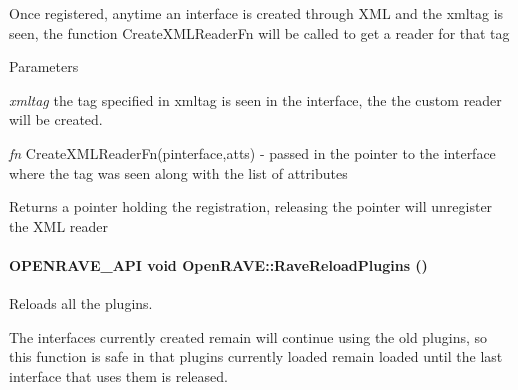 Once registered, anytime an interface is created through XML and the xmltag is seen, the function CreateXMLReaderFn will be called to get a reader for that tag 
\begin{DoxyParams}{Parameters}
\item[{\em xmltag}]the tag specified in xmltag is seen in the interface, the the custom reader will be created. \item[{\em fn}]CreateXMLReaderFn(pinterface,atts) -\/ passed in the pointer to the interface where the tag was seen along with the list of attributes \end{DoxyParams}
\begin{DoxyReturn}{Returns}
a pointer holding the registration, releasing the pointer will unregister the XML reader 
\end{DoxyReturn}
\hypertarget{namespaceOpenRAVE_a4fd5cea1bb7d822e6acc89625c59c5f2}{
\paragraph[{RaveReloadPlugins}]{\setlength{\rightskip}{0pt plus 5cm}OPENRAVE\_\-API void OpenRAVE::RaveReloadPlugins ()}\hfill}
\label{namespaceOpenRAVE_a4fd5cea1bb7d822e6acc89625c59c5f2}


Reloads all the plugins. 

The interfaces currently created remain will continue using the old plugins, so this function is safe in that plugins currently loaded remain loaded until the last interface that uses them is released. 